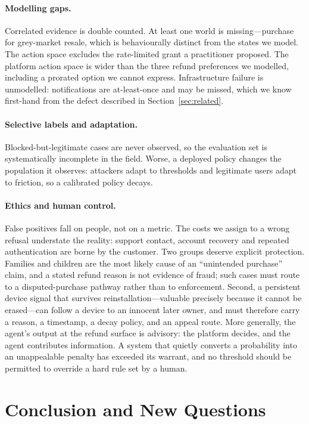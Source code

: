 \documentclass{article}
\begin{document}
\paragraph{Modelling gaps.} Correlated evidence is double counted. At least one world is
missing---purchase for grey-market resale, which is behaviourally distinct from the states
we model. The action space excludes the rate-limited grant a practitioner proposed. The
platform action space is wider than the three refund preferences we modelled, including a
prorated option we cannot express. Infrastructure failure is unmodelled: notifications are
at-least-once and may be missed, which we know first-hand from the defect described in
Section~\ref{sec:related}.

\paragraph{Selective labels and adaptation.} Blocked-but-legitimate cases are never
observed, so the evaluation set is systematically incomplete in the field. Worse, a
deployed policy changes the population it observes: attackers adapt to thresholds and
legitimate users adapt to friction, so a calibrated policy decays.

\paragraph{Ethics and human control.} False positives fall on people, not on a metric. The
costs we assign to a wrong refusal understate the reality: support contact, account
recovery and repeated authentication are borne by the customer. Two groups deserve explicit
protection. Families and children are the most likely cause of an ``unintended purchase''
claim, and a stated refund reason is not evidence of fraud; such cases must route to a
disputed-purchase pathway rather than to enforcement. Second, a persistent device signal
that survives reinstallation---valuable precisely because it cannot be erased---can follow
a device to an innocent later owner, and must therefore carry a reason, a timestamp, a
decay policy, and an appeal route. More generally, the agent's output at the refund surface
is advisory: the platform decides, and the agent contributes information. A system that
quietly converts a probability into an unappealable penalty has exceeded its warrant, and
no threshold should be permitted to override a hard rule set by a human.

\section{Conclusion and New Questions}
\end{document}

